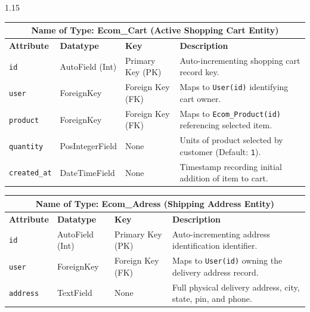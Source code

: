 \documentclass[12pt,a4paper]{article}
\begin{document}
{\begin{spacing}{1.15}
\begin{center}
\renewcommand{\arraystretch}{1.15}
\fontsize{9}{12}\selectfont
\begin{tabular}{|p{1.4in}|p{1.1in}|p{0.8in}|p{2.9in}|}
\hline
\multicolumn{4}{|c|}{\textbf{\fontsize{10}{13}\selectfont Name of Type: Ecom\_Cart (Active Shopping Cart Entity)}} \\ \hline
\textbf{Attribute} & \textbf{Datatype} & \textbf{Key} & \textbf{Description} \\ \hline
\texttt{id} & AutoField (Int) & Primary Key (PK) & Auto-incrementing shopping cart record key. \\ \hline
\texttt{user} & ForeignKey & Foreign Key (FK) & Maps to \texttt{User(id)} identifying cart owner. \\ \hline
\texttt{product} & ForeignKey & Foreign Key (FK) & Maps to \texttt{Ecom\_Product(id)} referencing selected item. \\ \hline
\texttt{quantity} & PosIntegerField & None & Units of product selected by customer (Default: \texttt{1}). \\ \hline
\texttt{created\_at} & DateTimeField & None & Timestamp recording initial addition of item to cart. \\ \hline
\end{tabular}
\end{center}

\vspace{0.06in}

\begin{center}
\renewcommand{\arraystretch}{1.15}
\fontsize{9}{12}\selectfont
\begin{tabular}{|p{1.4in}|p{1.1in}|p{0.8in}|p{2.9in}|}
\hline
\multicolumn{4}{|c|}{\textbf{\fontsize{10}{13}\selectfont Name of Type: Ecom\_Adress (Shipping Address Entity)}} \\ \hline
\textbf{Attribute} & \textbf{Datatype} & \textbf{Key} & \textbf{Description} \\ \hline
\texttt{id} & AutoField (Int) & Primary Key (PK) & Auto-incrementing address identification identifier. \\ \hline
\texttt{user} & ForeignKey & Foreign Key (FK) & Maps to \texttt{User(id)} owning the delivery address record. \\ \hline
\texttt{address} & TextField & None & Full physical delivery address, city, state, pin, and phone. \\ \hline
\end{tabular}
\end{center}


\end{spacing}}
\end{document}
